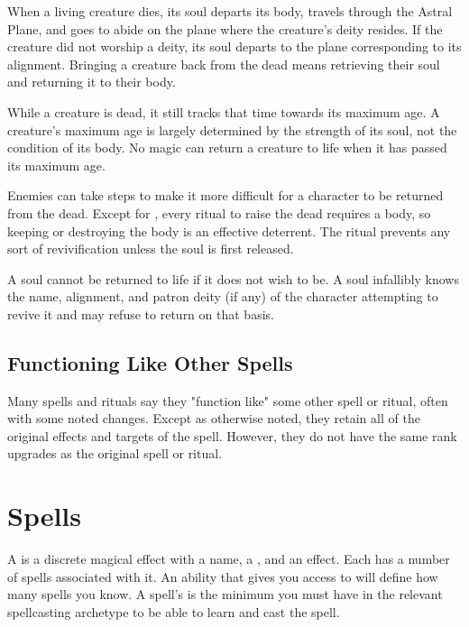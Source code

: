         When a living creature dies, its soul departs its body, travels through the Astral Plane, and goes to abide on the plane where the creature's deity resides.
        If the creature did not worship a deity, its soul departs to the plane corresponding to its alignment.
        Bringing a creature back from the dead means retrieving their soul and returning it to their body.

         While a creature is dead, it still tracks that time towards its maximum age.
        A creature's maximum age is largely determined by the strength of its soul, not the condition of its body.
        No magic can return a creature to life when it has passed its maximum age.

         Enemies can take steps to make it more difficult for a character to be returned from the dead.
        Except for , every ritual to raise the dead requires a body, so keeping or destroying the body is an effective deterrent.
        The  ritual prevents any sort of revivification unless the soul is first released.

         A soul cannot be returned to life if it does not wish to be.
        A soul infallibly knows the name, alignment, and patron deity (if any) of the character attempting to revive it and may refuse to return on that basis.

    \subsection{Functioning Like Other Spells}\label{Functioning Like Other Spells}
        Many spells and rituals say they "function like" some other spell or ritual, often with some noted changes.
        Except as otherwise noted, they retain all of the original effects and targets of the spell.
        However, they do not have the same rank upgrades as the original spell or ritual.

\section{Spells}\label{Spells}
    A  is a discrete magical effect with a name, a , and an effect.
    Each  has a number of spells associated with it.
    An ability that gives you access to  will define how many spells you know.
    A spell's  is the minimum  you must have in the relevant spellcasting archetype to be able to learn and cast the spell.

